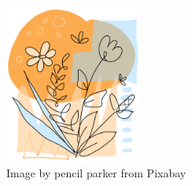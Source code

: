 \begin{figure}[h]
    \centering
    \includegraphics[width=0.4\textwidth]{images/image2.png}
    \caption{Image by pencil parker from Pixabay}
    \label{fig:figure2}
\end{figure}
